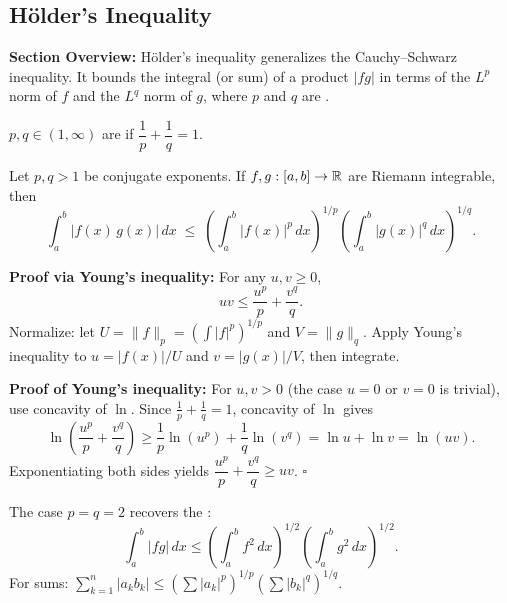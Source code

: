 \documentclass[../master/master.tex]{subfiles}
\begin{document}
\subsection{H\"{o}lder's Inequality}

\begin{summarybox}
\textbf{Section Overview:} H\"{o}lder's inequality generalizes the Cauchy--Schwarz inequality. It bounds the integral (or sum) of a product $|fg|$ in terms of the $L^p$ norm of $f$ and the $L^q$ norm of $g$, where $p$ and $q$ are .
\end{summarybox}

\begin{definition}
$p, q \in (1, \infty)$ are  if $\dfrac{1}{p} + \dfrac{1}{q} = 1$.
\end{definition}

\begin{theorem}
Let $p, q > 1$ be conjugate exponents. If $f, g : [a,b] \to \mathbb{R}$ are Riemann integrable, then
\[
    \int_a^b |f(x)\, g(x)|\, dx \;\leq\; \left(\int_a^b |f(x)|^p\, dx\right)^{1/p} \left(\int_a^b |g(x)|^q\, dx\right)^{1/q}.
\]
\end{theorem}

\begin{notebox}
\textbf{Proof via Young's inequality:} For any $u, v \geq 0$,
\[
    uv \leq \frac{u^p}{p} + \frac{v^q}{q}.
\]
Normalize: let $U = \|f\|_p = \left(\int |f|^p\right)^{1/p}$ and $V = \|g\|_q$. Apply Young's inequality to $u = |f(x)|/U$ and $v = |g(x)|/V$, then integrate.

\textbf{Proof of Young's inequality:} For $u, v > 0$ (the case $u=0$ or $v=0$ is trivial), use concavity of $\ln$. Since $\frac{1}{p} + \frac{1}{q} = 1$, concavity of $\ln$ gives
\[
    \ln\!\left(\frac{u^p}{p} + \frac{v^q}{q}\right)
    \geq \frac{1}{p}\ln(u^p) + \frac{1}{q}\ln(v^q)
    = \ln u + \ln v = \ln(uv).
\]
Exponentiating both sides yields $\dfrac{u^p}{p} + \dfrac{v^q}{q} \geq uv$. $\square$
\end{notebox}

\begin{remark}
The case $p = q = 2$ recovers the :
\[
    \int_a^b |f g|\, dx \leq \left(\int_a^b f^2\, dx\right)^{1/2}\!\left(\int_a^b g^2\, dx\right)^{1/2}.
\]
For sums: $\displaystyle\sum_{k=1}^n |a_k b_k| \leq \left(\sum |a_k|^p\right)^{1/p}\!\left(\sum |b_k|^q\right)^{1/q}$.
\end{remark}
\end{document}

